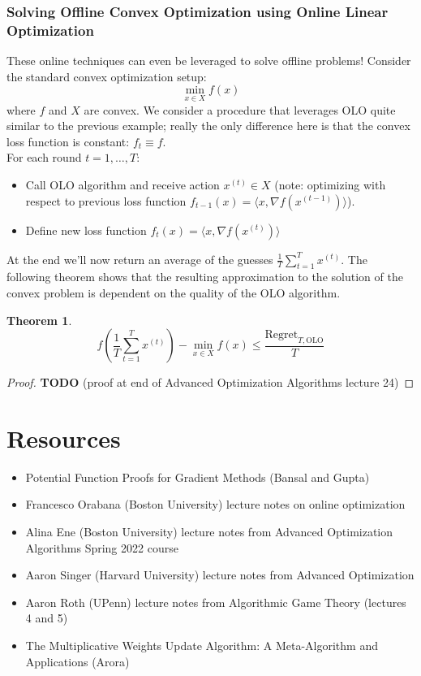 \documentclass[12pt]{article}
\newtheorem{thm}{Theorem}
\begin{document}
\subsubsection{Solving Offline Convex Optimization using Online Linear Optimization}
These online techniques can even be leveraged to solve offline problems! Consider the standard convex optimization setup:
\[\min_{x \in X} f(x)\]
where $f$ and $X$ are convex. We consider a procedure that leverages OLO quite similar to the previous example; really the only difference here is that the convex loss function 
is constant: $f_t \equiv f$. \\
For each round $t = 1, \dots, T$:
\begin{itemize}
\item Call OLO algorithm and receive action $x^{(t)} \in X$ (note: optimizing with respect to previous loss function $f_{t - 1}(x) = \langle x, \nabla f(x^{(t - 1)}) \rangle $). 
\item Define new loss function $f_t(x) = \langle x, \nabla f(x^{(t)})\rangle$
\end{itemize}
At the end we'll now return an average of the guesses $\frac{1}{T}\sum_{t = 1}^{T} x^{(t)}$. The following theorem shows that the resulting approximation to the solution of the convex problem
is dependent on the quality of the OLO algorithm. 
\begin{thm}
\[f\left(\frac{1}{T}\sum_{t = 1}^{T} x^{(t)}\right) - \min_{x \in X} f(x) \leq \frac{\text{Regret}_{T, \text{OLO}}}{T}\]
\end{thm}

\begin{proof}
\textbf{TODO} (proof at end of Advanced Optimization Algorithms lecture 24)
\end{proof}





\section{Resources}
\begin{itemize}
\item Potential Function Proofs for Gradient Methods (Bansal and Gupta) 
\item Francesco Orabana (Boston University) lecture notes on online optimization
\item Alina Ene (Boston University) lecture notes from Advanced Optimization Algorithms Spring 2022 course
\item Aaron Singer (Harvard University) lecture notes from Advanced Optimization
\item Aaron Roth (UPenn) lecture notes from Algorithmic Game Theory (lectures 4 and 5)
\item The Multiplicative Weights Update Algorithm: A Meta-Algorithm and Applications (Arora)
\end{itemize}
\end{document}
